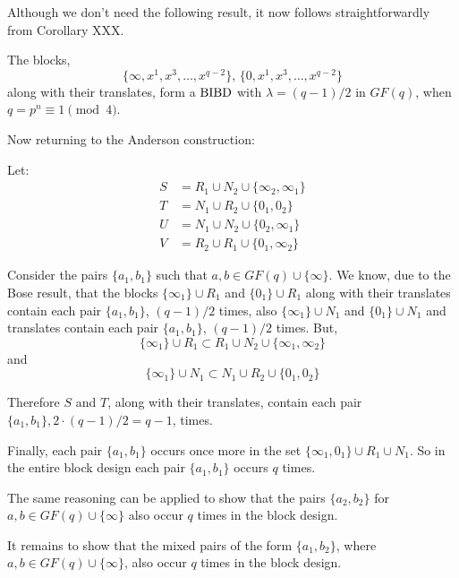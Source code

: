 Although we don’t need the following result, it now follows straightforwardly from Corollary XXX.

\begin{corollary}
The blocks,
\begin{equation}
\{\infty, x^1, x^3, \ldots, x^{q - 2}\},\, \{0, x^1, x^3, \ldots, x^{q - 2}\}
\end{equation}
along with their translates, form a $\operatorname{BIBD}$ with
$\lambda = (q - 1)/2$ in $GF(q)$, when
$q = p^n \equiv 1\pmod 4$.
\end{corollary}

Now returning to the Anderson construction:

Let:
\begin{align}
  S &= R_1 \cup N_2 \cup \{\infty _2, \infty _1\} \\
  T &= N_1 \cup R_2 \cup \{0_1, 0_2\} \\
  U &= N_1 \cup N_2 \cup \{0 _2, \infty _1\} \\
  V &= R_2 \cup R_1 \cup \{0_1, \infty _2\}
\end{align}

Consider the pairs $\{a_1, b_1\}$ such that $a, b \in GF(q) \cup \{\infty\}$.
We know, due to the Bose result, that the blocks $\{\infty _1\} \cup R_1$ and $\{0 _1\} \cup R_1$ along with their translates contain each pair $\{a_1, b_1\}$, $(q - 1)/2$ times, also $\{\infty _1\} \cup N_1$ and $\{0 _1\} \cup N_1$ and translates contain each pair $\{a_1, b_1\}$, $(q - 1)/2$ times.
But,
\begin{equation}
\{\infty _1\} \cup R_1 \subset R_1 \cup N_2 \cup \{\infty _1, \infty _2\}
\end{equation}
and
\begin{equation}
\{\infty _1\} \cup N_1 \subset N_1 \cup R_2 \cup \{0_1, 0_2\}
\end{equation}

Therefore $S$ and $T$, along with their translates, contain each pair $\{a_1, b_1\}, 2\cdot (q - 1)/2 = q - 1$, times.

Finally, each pair $\{a_1, b_1\}$ occurs once more in the set $\{\infty _1, 0_1\} \cup R_1 \cup N_1$.
So in the entire block design each pair $\{a_1, b_1\}$ occurs $q$ times.

The same reasoning can be applied to show that the pairs $\{a_2,b_2\}$ for $a,b \in GF(q) \cup \{\infty\}$ also occur $q$ times in the block design.

It remains to show that the mixed pairs of the form $\{a_1, b_2\}$, where $a, b \in GF(q) \cup \{\infty\}$, also occur $q$ times in the block design.

